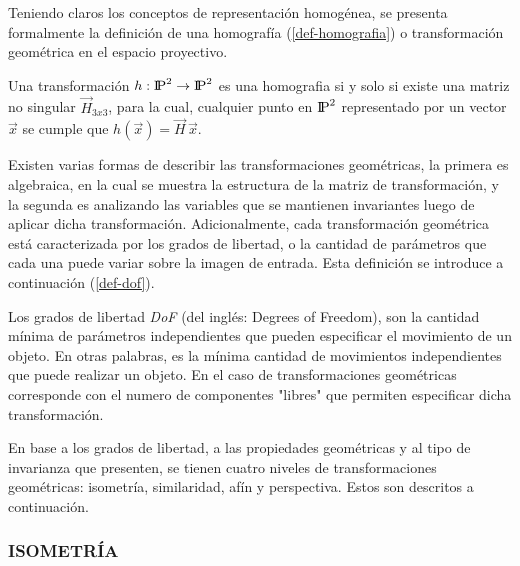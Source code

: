 Teniendo claros los conceptos de representación homogénea, se presenta formalmente la definición de una homografía (\ref{def-homografia}) o transformación geométrica en el espacio proyectivo.
\begin{displayquote}
	\vspace{-1.5cm}
	\begin{theorem}
		Una transformación $h : {\rm I\!P}^2 \to {\rm I\!P}^2$ es una homografia si y solo si existe una matriz no singular $\vec{H}_{3x3}$, para la cual, cualquier punto en ${\rm I\!P}^2$ representado por un vector $\vec{x}$ se cumple que $h(\vec{x}) = \vec{H}\,\vec{x}$.
		\label{def-homografia}
	\end{theorem} 
\end{displayquote}

Existen varias formas de describir las transformaciones geométricas, la primera es algebraica, en la cual se muestra la estructura de la matriz de transformación, y la segunda es analizando las variables que se mantienen invariantes luego de aplicar dicha transformación. Adicionalmente, cada transformación geométrica está caracterizada por los grados de libertad, o la cantidad de parámetros que cada una puede variar sobre la imagen de entrada. Esta definición se introduce a continuación (\ref{def-dof}).
\begin{displayquote}
	\vspace{-1.5cm}
	\begin{definition}
		Los grados de libertad \textit{DoF} (del inglés: Degrees of Freedom), son la cantidad mínima de parámetros independientes que pueden especificar el movimiento de un objeto. En otras palabras, es la mínima cantidad de movimientos independientes que puede realizar un objeto. En el caso de transformaciones geométricas corresponde con el numero de componentes "libres" que permiten especificar dicha transformación.
		\label{def-dof}
	\end{definition} 
\end{displayquote}

En base a los grados de libertad, a las propiedades geométricas y al tipo de invarianza que presenten, se tienen cuatro niveles de transformaciones geométricas: isometría, similaridad, afín y perspectiva. Estos son descritos a continuación.
\subsubsection*{ISOMETRÍA}

